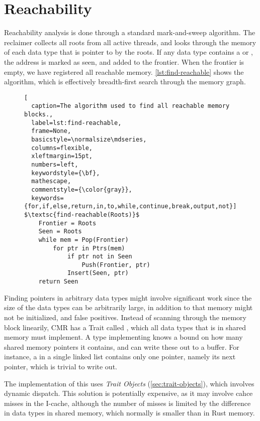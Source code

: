 \section{Reachability\label{sec:reachability}}

Reachability analysis is done through a standard mark-and-sweep algorithm. The reclaimer collects
all roots from all active threads, and looks through the memory of each data type that is pointer
to by the roots. If any data type contains a  or , the address is marked as seen,
and added to the frontier. When the frontier is empty, we have registered all reachable memory.
\cref{lst:find-reachable} shows the algorithm, which is effectively breadth-first search
through the memory graph.

\begin{figure}[ht]
\begin{lstlisting}[
  caption=The algorithm used to find all reachable memory blocks.,
  label=lst:find-reachable,
  frame=None,
  basicstyle=\normalsize\mdseries,
  columns=flexible,
  xleftmargin=15pt,
  numbers=left,
  keywordstyle={\bf},
  mathescape,
  commentstyle={\color{gray}},
  keywords={for,if,else,return,in,to,while,continue,break,output,not}]
$\textsc{find-reachable(Roots)}$
    Frontier = Roots
    Seen = Roots
    while mem = Pop(Frontier)
        for ptr in Ptrs(mem)
            if ptr not in Seen
                Push(Frontier, ptr)
            Insert(Seen, ptr)
    return Seen
\end{lstlisting}
\end{figure}

Finding pointers in arbitrary data types might involve significant work since the size of the data
types can be arbitrarily large, in addition to that memory might not be initialized, and false
positives. Instead of scanning through the memory block linearily,  CMR has a Trait called , which all
data types that is in shared memory must implement.  A type implementing  knows a bound
on how many shared memory pointers it contains, and can write these out to a buffer. For instance,
a  in a single linked list contains only one pointer, namely its next pointer, which is
trivial to write out.

The implementation of this uses \emph{Trait Objects} (\cref{sec:trait-objects}), which involves
dynamic dispatch. This solution is potentially expensive, as it may involve cahce misses in the
I-cache, although the number of misses is limited by the difference in data types in shared memory,
which normally is smaller than in Rust memory.

